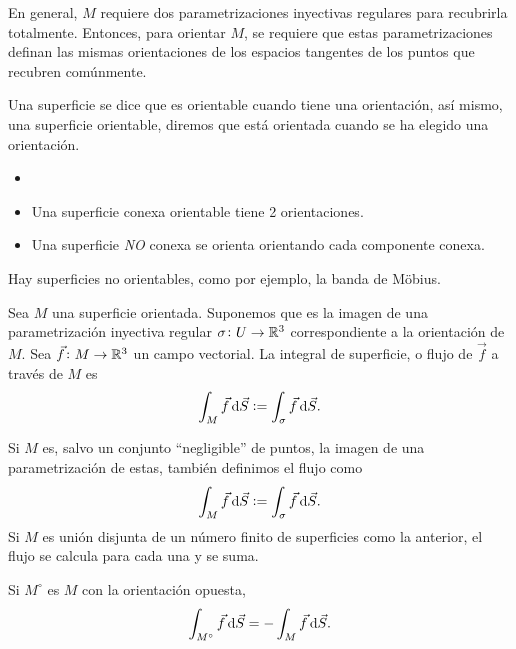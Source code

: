 \begin{obs}
    En general, $M$ requiere dos parametrizaciones inyectivas regulares para recubrirla totalmente. Entonces, para orientar $M$, se requiere que
    estas parametrizaciones definan las mismas orientaciones de los espacios tangentes de los puntos que recubren comúnmente.
\end{obs}

\begin{defi}
    Una superficie se dice que es orientable cuando tiene una orientación, así mismo, una superficie orientable, diremos que está
    orientada cuando se ha elegido una orientación.
\end{defi}

\begin{obs}
    \begin{itemize}
        \item[]
        \item Una superficie conexa orientable tiene 2 orientaciones.
        \item Una superficie \emph{NO} conexa se orienta orientando cada componente conexa.
    \end{itemize}
\end{obs}
\begin{obs}
    Hay superficies no orientables, como por ejemplo, la banda de Möbius.
\end{obs}

\begin{defi}
    Sea $M$ una superficie orientada. Suponemos que es la imagen de una parametrización inyectiva regular $\sigma \colon U \to \mathbb{R}^3$
    correspondiente a la orientación de $M$. Sea $\vec{f} \colon M \to \mathbb{R}^3$ un campo vectorial. La integral de superficie, o flujo de $\vec{f}$
    a trav\'es de $M$ es
    \[
        \int_M \vec{f} \dif \vec{S} := \int_\sigma \vec{f} \dif \vec{S}.
    \]
\end{defi}

\begin{obs}
    Si $M$ es, salvo un conjunto ``negligible'' de puntos, la imagen de una parametrización de estas, tambi\'en definimos el flujo como
    \[
        \int_M \vec{f} \dif \vec{S} := \int_\sigma \vec{f} \dif \vec{S}.
    \]
    Si $M$ es unión disjunta de un número finito de superficies como la anterior, el flujo se calcula para cada una y se suma.
\end{obs}

\begin{obs}
    Si $M^\circ$ es $M$ con la orientación opuesta,
    \[
        \int_{M^\circ} \vec{f} \dif \vec{S} = - \int_M \vec{f} \dif \vec{S}.
    \]
\end{obs}

